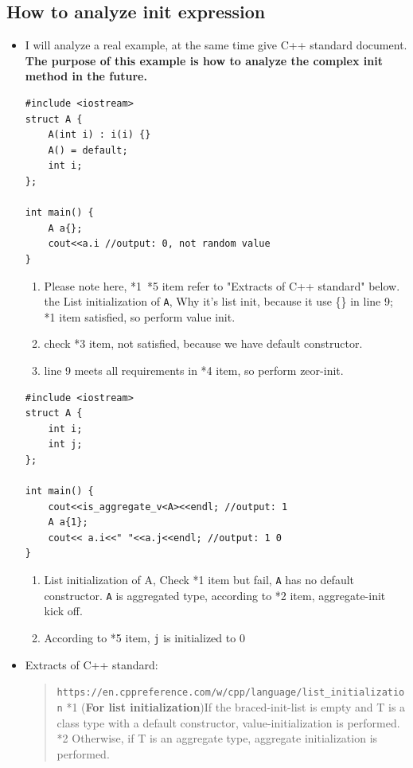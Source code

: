 \documentclass[a4paper,11pt,twoside]{book}
\begin{document}
\subsection{How to analyze init expression}
\begin{itemize}
	\item I will analyze a real example, at the same time give C++ standard document. \textbf{The purpose of this example is how to analyze the complex init method in the future.}
\begin{lstlisting}
#include <iostream>
struct A {
	A(int i) : i(i) {}
	A() = default;
	int i;
};
		
int main() {
	A a{};
	cout<<a.i //output: 0, not random value
}
\end{lstlisting}
	
	\begin{enumerate}
		\item Please note here, *1~*5 item refer to "Extracts of C++ standard" below. the List initialization of \texttt{A}, Why it's list init, because it use \{\} in line 9; *1 item satisfied, so perform value init. 
		
		\item check *3 item, not satisfied, because we have default constructor. 
		
		\item line 9 meets all requirements in *4 item, so perform zeor-init.

	\end{enumerate}
	
	
\begin{lstlisting}
#include <iostream>
struct A {
	int i;
	int j;
};
	
int main() {
	cout<<is_aggregate_v<A><<endl; //output: 1
    A a{1};
	cout<< a.i<<" "<<a.j<<endl; //output: 1 0
}
\end{lstlisting}
	
	\begin{enumerate}
		\item List initialization of A, Check *1 item but fail, \texttt{A} has no default constructor. \texttt{A} is aggregated type, according to *2 item, aggregate-init kick off.
		
		\item According to *5 item, \texttt{j} is initialized to 0		
	\end{enumerate}
	
	
	\item  Extracts of C++ standard: 
	
	\begin{quote}
		\verb|https://en.cppreference.com/w/cpp/language/list_initialization| \newline
		*1 (\textbf{For list initialization})If the braced-init-list is empty and T is a class type with a default constructor, value-initialization is performed. 
		\newline
		*2 Otherwise, if T is an aggregate type, aggregate initialization is performed.
		\newline
		 \newline
		

\end{quote}
\end{itemize}
\end{document}
